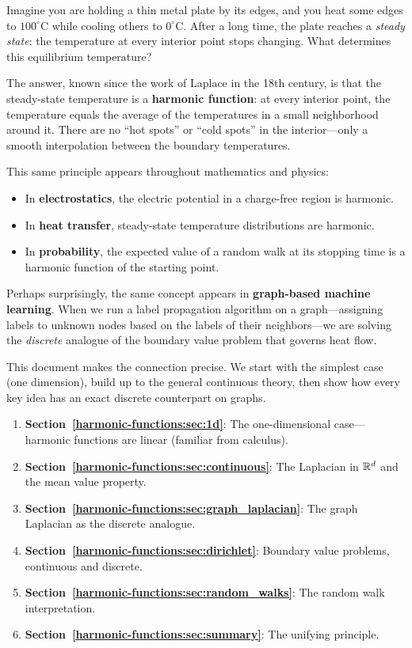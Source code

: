 \begin{notechapter}
Imagine you are holding a thin metal plate by its edges, and you heat some
edges to $100^\circ$C while cooling others to $0^\circ$C. After a long time,
the plate reaches a \emph{steady state}: the temperature at every interior
point stops changing. What determines this equilibrium temperature?

The answer, known since the work of Laplace in the 18th century, is that the
steady-state temperature is a \textbf{harmonic function}: at every interior
point, the temperature equals the average of the temperatures in a small
neighborhood around it. There are no ``hot spots'' or ``cold spots'' in the
interior---only a smooth interpolation between the boundary temperatures.

This same principle appears throughout mathematics and physics:
\begin{itemize}
    \item In \textbf{electrostatics}, the electric potential in a charge-free
          region is harmonic.
    \item In \textbf{heat transfer}, steady-state temperature distributions
          are harmonic.
    \item In \textbf{probability}, the expected value of a random walk at its
          stopping time is a harmonic function of the starting point.
\end{itemize}

Perhaps surprisingly, the same concept appears in \textbf{graph-based
machine learning}. When we run a label propagation algorithm on a
graph---assigning labels to unknown nodes based on the labels of their
neighbors---we are solving the \emph{discrete} analogue of the boundary
value problem that governs heat flow.

This document makes the connection precise. We start with the simplest
case (one dimension), build up to the general continuous theory, then show
how every key idea has an exact discrete counterpart on graphs.

\begin{connectionbox}[title=Roadmap]
\begin{enumerate}
    \item \textbf{Section~\ref{harmonic-functions:sec:1d}}: The one-dimensional case---harmonic
          functions are linear (familiar from calculus).
    \item \textbf{Section~\ref{harmonic-functions:sec:continuous}}: The Laplacian in $\mathbb{R}^d$ and
          the mean value property.
    \item \textbf{Section~\ref{harmonic-functions:sec:graph_laplacian}}: The graph Laplacian as
          the discrete analogue.
    \item \textbf{Section~\ref{harmonic-functions:sec:dirichlet}}: Boundary value problems,
          continuous and discrete.
    \item \textbf{Section~\ref{harmonic-functions:sec:random_walks}}: The random walk
          interpretation.
    \item \textbf{Section~\ref{harmonic-functions:sec:summary}}: The unifying principle.
\end{enumerate}
\end{connectionbox}



\end{notechapter}
